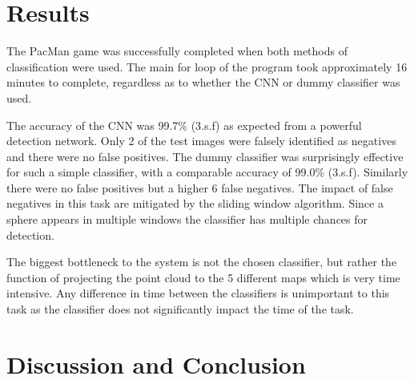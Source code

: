 \documentclass{article}
\begin{document}
\section{Results}

The PacMan game was successfully completed when both methods of classification were used.
The main for loop of the program took approximately 16 minutes to complete, regardless as to whether the CNN or dummy classifier was used.

The accuracy of the CNN was 99.7\% (3.s.f) as expected from a powerful detection network.
Only 2 of the test images were falsely identified as negatives and there were no false positives.
The dummy classifier was surprisingly effective for such a simple classifier, with a comparable accuracy of 99.0\% (3.s.f). 
Similarly there were no false positives but a higher 6 false negatives.
The impact of false negatives in this task are mitigated by the sliding window algorithm.
Since a sphere appears in multiple windows the classifier has multiple chances for detection. 


The biggest bottleneck to the system is not the chosen classifier, but rather the function of projecting the point cloud to the 5 different maps which is very time intensive.
Any difference in time between the classifiers is unimportant to this task as the classifier does not significantly impact the time of the task. 

\section{Discussion and Conclusion}
\end{document}
